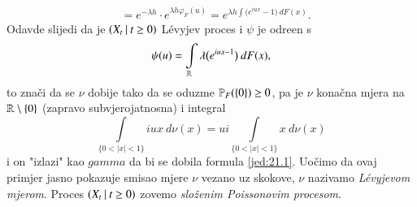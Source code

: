 \begin{pr}
\begin{equation}
\begin{aligned}
            &= e^{-\lambda h} \cdot e^{\lambda h \varphi_F (u)} = e^{\lambda h \int \big( e^{i u x} - 1 \big) \: d F (x)}.
        \end{aligned}
    \end{equation}
    Odavde slijedi da je $({X_t} \: | \: {t \geq 0})$ L\' evyjev proces i $\psi$ je odre\dj en s
    \begin{equation}    \label{jed:21.13}
        \psi (u) = \int\limits_{\mathbb{R}} \lambda \big( e^{i u x - 1} \big) \: d F (x),
    \end{equation}
    to zna\v ci da se $\nu$ dobije tako da se oduzme $\mathbb{P}_F (\{0\}) \geq 0$, pa je $\nu$ kona\v cna mjera na $\mathbb{R} \setminus \{0\}$ (zapravo subvjerojatnosna) i integral
    \begin{equation*}
        \int\limits_{\{ 0 < |x| < 1 \}} i u x \: d \nu (x) = u i \int\limits_{\{ 0 < |x| < 1 \}} x \: d \nu (x)
    \end{equation*}
    i on "izlazi" kao $gamma$ da bi se dobila formula \eqref{jed:21.1}.
    Uo\v cimo da ovaj primjer jasno pokazuje smisao mjere $\nu$ vezano uz skokove, $\nu$ nazivamo \emph{L\' evyjevom mjerom}.
    Proces $({X_t} \: | \: {t \geq 0})$ zovemo \emph{slo\v zenim Poissonovim procesom}.
\end{pr}